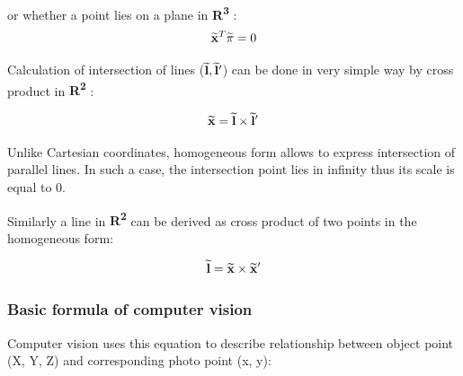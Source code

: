 \documentclass[a4paper,12pt]{article}
\newcommand{\ehvect}[1]{%
{\bf \widetilde{#1}}%
}
\newcommand{\escal}[1]{%
{\it #1}%
}
\newcommand{\eucl}[1]{%
{\bf R\textsuperscript{#1}}%
}
\begin{document}
or whether a point lies on a plane in \eucl{3}:
\begin{equation}
\ehvect{x}^{T} \ehvect{\pi} = 0
\end{equation}


% 

Calculation of intersection of  lines ($\ehvect{l}, \ehvect{l}'$)  can be done in very simple way by cross product in \eucl{2}:

\begin{equation}
\ehvect{x} = \ehvect{l} \times \ehvect{l}' \label{eq:def_hline_pts}
\end{equation}

Unlike Cartesian coordinates, homogeneous form allows to express intersection of parallel lines. 
In such a case, the intersection point lies in infinity thus its scale is equal to 0.

Similarly a line in \eucl{2}  can be derived as cross product of two points in the homogeneous form:

\begin{equation}
\ehvect{l} = \ehvect{x} \times \ehvect{x}'
\end{equation}


\subsubsection{Basic formula of computer vision}

Computer vision uses this equation to describe relationship between
object point (X, Y, Z) and corresponding photo point (x, y):
\end{document}
